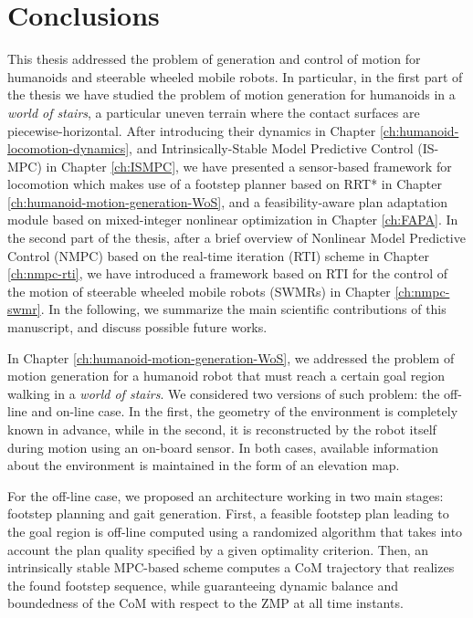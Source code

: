\chapter{Conclusions}
This thesis addressed the problem of generation and control of motion for 
humanoids and steerable wheeled 
mobile robots. In particular, in the first part of the thesis
we have studied the problem of motion generation for humanoids 
in a \textit{world of stairs}, a particular uneven terrain where the contact 
surfaces are piecewise-horizontal. After introducing their dynamics in Chapter
\ref{ch:humanoid-locomotion-dynamics}, and Intrinsically-Stable Model Predictive
Control (IS-MPC) in Chapter \ref{ch:ISMPC},
we have presented a sensor-based framework for locomotion which makes use of a
footstep planner 
based on RRT* in Chapter \ref{ch:humanoid-motion-generation-WoS}, and a 
feasibility-aware plan adaptation module based on mixed-integer nonlinear
optimization in Chapter \ref{ch:FAPA}. In the second part of the thesis,
after a brief overview of Nonlinear Model Predictive Control (NMPC) based on the
real-time iteration (RTI) scheme in Chapter \ref{ch:nmpc-rti}, we have 
introduced a framework based on RTI for the control of the motion of steerable wheeled 
mobile robots (SWMRs) in Chapter \ref{ch:nmpc-swmr}. In the following, we
summarize the main scientific contributions of this manuscript, and discuss 
possible future works.

\medskip

In Chapter \ref{ch:humanoid-motion-generation-WoS},
we addressed the problem of motion generation for a humanoid
robot that must reach a certain goal region walking in a \textit{world of stairs}.
We considered two versions of such problem: the off-line and on-line case. 
In the first, the geometry of the environment is completely known in advance,
while in the second, it is reconstructed by the robot itself during motion using
an on-board sensor. In both cases, available information about the environment
is maintained in the form of an elevation map. 

For the off-line case, we proposed an architecture working in two main stages:
footstep planning and gait generation.
First, a feasible footstep plan leading to the goal region is off-line computed
using a randomized algorithm that takes into account the plan quality specified
by a given optimality criterion.
Then, an intrinsically stable MPC-based scheme computes a CoM trajectory that
realizes the found footstep sequence, while guaranteeing dynamic balance and
boundedness of the CoM with respect to the ZMP at all time instants.

